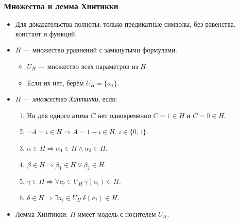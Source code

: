 \documentclass[10pt]{beamer}
\begin{document}
\begin{frame}
\begin{framefont}{\small}
    \frametitle{Множества и лемма Хинтикки}
    \begin{itemize}
        \item Для доказательства полноты: только предикатные символы, без равенства, констант и функций.
        \pause
        \item $H$ --- множество уравнений с замкнутыми формулами.
        \begin{itemize}
            \item $U_H$ --- множество всех параметров из $H$.
            \item Если их нет, берём $U_H=\{a_1\}$.
        \end{itemize}
        \item $H$ --- \emph{множество Хинтикки}, если:
        \begin{enumerate}
            \item Ни для одного атома $C$ нет одновременно $C=1\in H$ и $C=0\in H$.
            \item $\neg A=i\in H \Rightarrow A=1-i\in H$, $i\in\{0,1\}$.
            \item $\alpha \in H \Rightarrow \alpha_1 \in H \land \alpha_2 \in H$.
            \item $\beta \in H \Rightarrow \beta_1 \in H \lor \beta_2 \in H$.
            \item $\gamma \in H \Rightarrow \forall a_i \in U_H ~ \gamma(a_i) \in H$.
            \item $\delta \in H \Rightarrow \exists a_i \in U_H ~ \delta(a_i) \in H$.
        \end{enumerate}
        \pause
        \item Лемма Хинтикки: $H$ имеет модель с носителем $U_H$.
    \end{itemize}
\end{framefont}
\end{frame}
\end{document}
